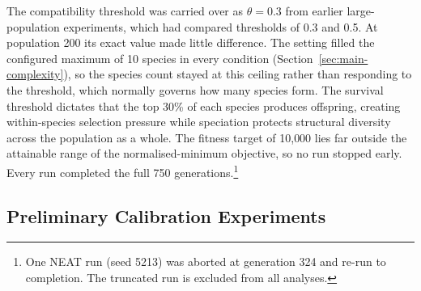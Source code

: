 \documentclass[12pt]{article}
\begin{document}
The compatibility threshold was carried over as $\theta = 0.3$ from earlier large-population experiments, which had compared thresholds of 0.3 and 0.5.
At population 200 its exact value made little difference. The setting filled the configured maximum of 10 species in every condition (Section~\ref{sec:main-complexity}), so the species count stayed at this ceiling rather than responding to the threshold, which normally governs how many species form.
The survival threshold dictates that the top 30\% of each species produces offspring, creating within-species selection pressure while speciation protects structural diversity across the population as a whole.
The fitness target of 10{,}000 lies far outside the attainable range of the normalised-minimum objective, so no run stopped early. Every run completed the full 750 generations.\footnote{One NEAT run (seed 5213) was aborted at generation 324 and re-run to completion. The truncated run is excluded from all analyses.}

\subsection{Preliminary Calibration Experiments}
\label{subsec:calibration}
\end{document}

